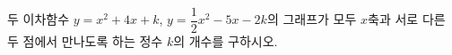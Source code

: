 두 이차함수 $y=x^2+4x+k$, $y=\dfrac{1}{2}x^2-5x-2k$의 그래프가 모두 $x$축과 서로 다른 두 점에서 만나도록 하는 정수 $k$의 개수를 구하시오.
